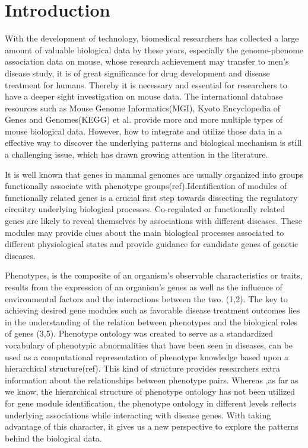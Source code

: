 \documentclass{bmcart}
\begin{document}
\section*{Introduction}
With the development of technology, biomedical researchers has collected a large amount of valuable biological data by these years, especially the genome-phenome association data on mouse, whose research achievement may transfer to men's disease study, it is of great significance for drug development and disease treatment for humans. Thereby it is necessary and essential for researchers to have a deeper sight investigation on mouse data. The international database resources such as Mouse Genome Informatics(MGI), Kyoto Encyclopedia of Genes and Genomes(KEGG) et al. provide more and more multiple types of mouse biological data. However, how to integrate and utilize those data in a effective way to discover the underlying patterns and biological mechanism is still a challenging issue, which has drawn growing attention in the literature.

It is well known that genes in mammal genomes are usually organized into groups functionally associate with phenotype groups(ref).Identification of modules of functionally related genes is a crucial first step towards dissecting the regulatory circuitry underlying biological processes. Co-regulated or functionally related genes are likely to reveal themselves by associations with different diseases. These modules may provide clues about the main biological processes associated to different physiological states and provide guidance for candidate genes of genetic diseases.

Phenotypes, is the composite of an organism's observable characteristics or traits, results from the expression of an organism's genes as well as the influence of environmental factors and the interactions between the two. (1,2). The key to achieving desired gene modules such as favorable disease treatment outcomes lies in the understanding of the relation between phenotypes and the biological roles of genes (3,5). Phenotype ontology was created to serve as a standardized vocabulary of phenotypic abnormalities that have been seen in diseases, can be used as a computational representation of phenotype knowledge based upon a hierarchical structure(ref). This kind of structure provides researchers extra information about the relationships between phenotype pairs. Whereas ,as far as we know, the hierarchical structure of phenotype ontology has not been utilized for gene module identification, the phenotype ontology in different levels reflects underlying associations while interacting with disease genes. With taking advantage of this character, it gives us a new perspective to explore the patterns behind the biological data.
\end{document}
